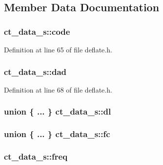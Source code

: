 \subsection{Member Data Documentation}
\hypertarget{structct__data__s_a242f709ab288db2d155e28ce98c510c5}{
\subsubsection[{code}]{ ct\-\_\-data\-\_\-s\-::code}}\label{structct__data__s_a242f709ab288db2d155e28ce98c510c5}


Definition at line 65 of file deflate.\-h.

\hypertarget{structct__data__s_a73955d00dbdac5ad4027804a00726bfa}{
\subsubsection[{dad}]{ ct\-\_\-data\-\_\-s\-::dad}}\label{structct__data__s_a73955d00dbdac5ad4027804a00726bfa}


Definition at line 68 of file deflate.\-h.

\hypertarget{structct__data__s_ac5b7c7528807e1fcc3d1a201c82dba35}{
\subsubsection[{dl}]{\setlength{\rightskip}{0pt plus 5cm}union \{ ... \}   ct\-\_\-data\-\_\-s\-::dl}}\label{structct__data__s_ac5b7c7528807e1fcc3d1a201c82dba35}
\hypertarget{structct__data__s_ad14c7dd62b683cbd581a27c0ea0d0b11}{
\subsubsection[{fc}]{\setlength{\rightskip}{0pt plus 5cm}union \{ ... \}   ct\-\_\-data\-\_\-s\-::fc}}\label{structct__data__s_ad14c7dd62b683cbd581a27c0ea0d0b11}
\hypertarget{structct__data__s_a67cd3c3267ba768c4494b36d5929c4bf}{
\subsubsection[{freq}]{ ct\-\_\-data\-\_\-s\-::freq}}\label{structct__data__s_a67cd3c3267ba768c4494b36d5929c4bf}


